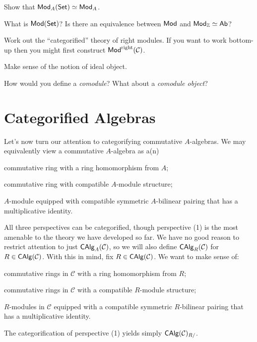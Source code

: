 \documentclass[11pt]{article}
\renewcommand{\C}{\mathcal{C}}
\DeclareMathOperator{\rright}{right} %
\begin{document}
\begin{exercise}
Show that $\operatorname{\mathsf{Mod}}_A(\operatorname{\mathsf{Set}})\simeq\operatorname{\mathsf{Mod}}_A$.
\end{exercise}

\begin{exercise}
What is $\operatorname{\mathsf{Mod}}(\operatorname{\mathsf{Set}})$? Is there an equivalence between $\operatorname{\mathsf{Mod}}$ and $\operatorname{\mathsf{Mod}}_{\mathbb{Z}}\simeq\operatorname{\mathsf{Ab}}$?
\end{exercise}

\begin{exercise}
Work out the ``categorified'' theory of right modules. If you want to work bottom-up then you might first construct $\Mod^{\rright}(\C)$.
\end{exercise}

\begin{exercise}
Make sense of the notion of ideal object.
\end{exercise}

\begin{exercise}
How would you define a \emph{comodule}? What about a \emph{comodule object}?
\end{exercise}

\section{Categorified Algebras}
Let's now turn our attention to categorifying commutative $A$-algebras. We may equivalently view a commutative $A$-algebra as a(n)
\begin{enum}{\arabic}
\item commutative ring with a ring homomorphism from $A$;

\item commutative ring with compatible $A$-module structure; 

\item $A$-module equipped with compatible symmetric $A$-bilinear pairing that has a multiplicative identity.
\end{enum}
All three perspectives can be categorified, though perspective (1) is the most amenable to the theory we have developed so far. We have no good reason to restrict attention to just $\CAlg_A(\C)$, so we will also define $\CAlg_R(\C)$ for $R\in\CAlg(\C)$. With this in mind, fix $R\in\CAlg(\C)$. We want to make sense of:
\begin{enum}{\arabic}
\item commutative rings in $\C$ with a ring homomorphism from $R$;

\item commutative rings in $\C$ with a compatible $R$-module structure; 

\item $R$-modules in $\C$ equipped with a compatible symmetric $R$-bilinear pairing that has a multiplicative identity.
\end{enum}
The categorification of perspective (1) yields simply $\CAlg(\C)_{R/}$. 
\end{document}
